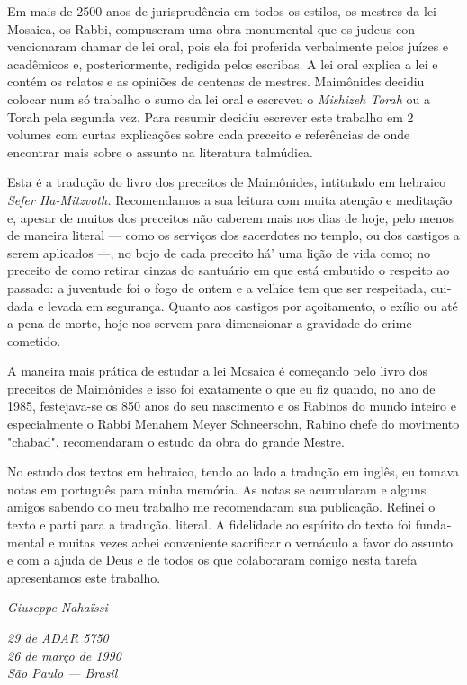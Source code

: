 \begin{itemize}
Em mais de 2500 anos de jurisprudência em todos os estilos, os mestres
da lei Mosaica, os Rabbi, compuseram uma obra monumental que os judeus
con­vencionaram chamar de lei oral, pois ela foi proferida verbalmente
pelos juízes e acadêmicos e, posteriormente, redigida pelos escribas. A
lei oral explica a lei e con­tém os relatos e as opiniões de centenas de
mestres. Maimônides decidiu colocar num só trabalho o sumo da lei oral e
escreveu o \emph{Mishizeh Torah} ou a Torah pela segunda vez. Para
resumir decidiu escrever este trabalho em 2 volumes com curtas
explicações sobre cada preceito e referências de onde encontrar mais
sobre o as­sunto na literatura talmúdica.

Esta é a tradução do livro dos preceitos de Maimônides, intitulado em
hebraico \emph{Sefer Ha-Mitzvoth.} Recomendamos a sua leitura com muita
atenção e me­ditação e, apesar de muitos dos preceitos não caberem mais
nos dias de hoje, pelo menos de maneira literal --- como os serviços dos
sacerdotes no templo, ou dos cas­tigos a serem aplicados ---, no bojo de
cada preceito há' uma lição de vida como; no preceito de como retirar
cinzas do santuário em que está embutido o respeito ao passado: a
juventude foi o fogo de ontem e a velhice tem que ser respeitada,
cui­dada e levada em segurança. Quanto aos castigos por açoitamento, o
exílio ou até a pena de morte, hoje nos servem para dimensionar a
gravidade do crime cometido.

A maneira mais prática de estudar a lei Mosaica é começando pelo livro
dos preceitos de Maimônides e isso foi exatamente o que eu fiz quando,
no ano de 1985, festejava-se os 850 anos do seu nascimento e os Rabinos
do mundo inteiro e especialmente o Rabbi Menahem Meyer Schneersohn,
Rabino chefe do movimento "chabad", recomendaram o estudo da obra do
grande Mestre.

No estudo dos textos em hebraico, tendo ao lado a tradução em inglês, eu
tomava notas em português para minha memória. As notas se acumularam e
al­guns amigos sabendo do meu trabalho me recomendaram sua publicação.
Refinei o texto e parti para a tradução. literal. A fidelidade ao
espírito do texto foi funda­mental e muitas vezes achei conveniente
sacrificar o vernáculo a favor do assunto e com a ajuda de Deus e de
todos os que colaboraram comigo nesta tarefa apresen­tamos este
trabalho.


\emph{Giuseppe Nahaïssi}


\emph{29 de ADAR 5750\\
26 de março de 1990\\
São Paulo --- Brasil}



\end{itemize}
